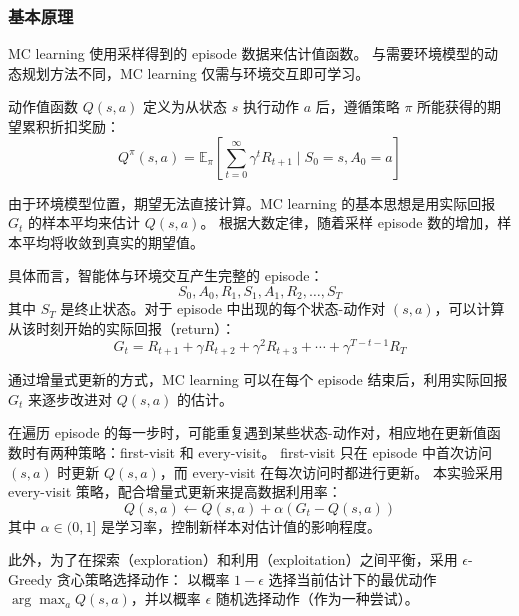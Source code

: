 \subsubsection{基本原理}

MC learning 使用采样得到的 episode 数据来估计值函数。
与需要环境模型的动态规划方法不同，MC learning 仅需与环境交互即可学习。

动作值函数 $Q(s,a)$ 定义为从状态 $s$ 执行动作 $a$ 后，遵循策略 $\pi$ 所能获得的期望累积折扣奖励：
\begin{equation}
    \label{eq:q_function}
    Q^\pi(s,a) = \mathbb{E}_\pi \left[ \sum_{t=0}^\infty \gamma^t R_{t+1} \mid S_0 = s, A_0 = a \right]
\end{equation}

由于环境模型位置，期望无法直接计算。MC learning 的基本思想是用实际回报 $G_t$ 的样本平均来估计 $Q(s,a)$。
根据大数定律，随着采样 episode 数的增加，样本平均将收敛到真实的期望值。

具体而言，智能体与环境交互产生完整的 episode：
\begin{equation}
    \label{eq:trajectory}
    S_0, A_0, R_1, S_1, A_1, R_2, \ldots, S_T
\end{equation}
其中 $S_T$ 是终止状态。对于 episode 中出现的每个状态-动作对 $(s,a)$，可以计算从该时刻开始的实际回报（return）：
\begin{equation}
    \label{eq:return}
    G_t = R_{t+1} + \gamma R_{t+2} + \gamma^2 R_{t+3} + \cdots + \gamma^{T-t-1} R_T
\end{equation}

通过增量式更新的方式，MC learning 可以在每个 episode 结束后，利用实际回报 $G_t$ 来逐步改进对 $Q(s,a)$ 的估计。


在遍历 episode 的每一步时，可能重复遇到某些状态-动作对，相应地在更新值函数时有两种策略：first-visit 和 every-visit。
first-visit 只在 episode 中首次访问 $(s,a)$ 时更新 $Q(s,a)$，而 every-visit 在每次访问时都进行更新。
本实验采用 every-visit 策略，配合增量式更新来提高数据利用率：
\begin{equation}
    \label{eq:mc_update}
    Q(s,a) \leftarrow Q(s,a) + \alpha \left( G_t - Q(s,a) \right)
\end{equation}
其中 $\alpha \in (0,1]$ 是学习率，控制新样本对估计值的影响程度。

此外，为了在探索（exploration）和利用（exploitation）之间平衡，采用 $\epsilon$-Greedy 贪心策略选择动作：
以概率 $1-\epsilon$ 选择当前估计下的最优动作 $\arg\max_a Q(s,a)$，并以概率 $\epsilon$ 随机选择动作（作为一种尝试）。

